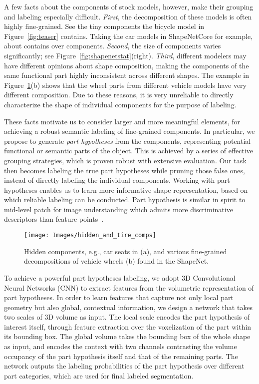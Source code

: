\documentclass[acmtog]{acmart}
\newcommand{\new}[1]{{\color{black}#1}}
\newcommand{\wang}[1]{{\color{black}#1}}
\begin{document}
{A few facts about the components of stock models, however, make their grouping and labeling especially difficult.
\emph{First}, the decomposition of these models is often highly fine-grained.
See the tiny components the bicycle model in Figure~\ref{fig:teaser} contains.
Taking the car models in ShapeNetCore for example, about  contains over  components.
\emph{Second}, the size of components varies significantly; see Figure~\ref{fig:shapenetstat}(right).
\emph{Third}, different modelers may have different opinions about shape composition,
making the components of the same functional part highly inconsistent across different shapes.
The example in Figure~\ref{fig:car}(b) shows that the wheel parts from different vehicle models
have very different composition.
Due to these reasons, it is very unreliable to directly characterize the shape of individual components for the purpose of labeling.





These facts motivate us to consider larger and more meaningful elements, for achieving a robust semantic
labeling of fine-grained components.
In particular, we propose to generate \emph{part hypotheses} from the components, representing potential
functional or semantic parts of the object. This is achieved by a series of effective grouping
strategies, which is proven robust with extensive evaluation.
\wang{Our task then becomes labeling the true part hypotheses while pruning those false ones,
instead of directly labeling the individual components.}
Working with part hypotheses enables us to learn more informative shape representation,
based on which reliable labeling can be conducted.
Part hypothesis is similar in spirit to mid-level patch for image understanding which admits
more discriminative descriptors than feature points~\cite{Singh2012}.



\begin{figure}[t]
  \centering
  \texttt{[image: Images/hidden\_and\_tire\_comps]}
  \caption{\new{Hidden components, e.g., car seats in (a), and various fine-grained decompositions of vehicle wheels (b)
  found in the ShapeNet.}}
  \label{fig:car}
\end{figure}


To achieve a powerful part hypotheses labeling, we adopt 3D Convolutional Neural Networks (CNN)
to extract features from the volumetric representation of part hypotheses.
In order to learn features that capture not only local part geometry but also global, contextual information,
we design a network that takes two scales of 3D volume as input.
The local scale encodes the part hypothesis of interest itself, through feature extraction over
the voxelization of the part within its bounding box.
The global volume takes the bounding box of the whole shape as input, and encodes the context
with two channels contrasting the volume occupancy of the part hypothesis itself and that of the remaining parts.
The network outputs the labeling probabilities of the part hypothesis over different part categories, which are used for final labeled segmentation.

}
\end{document}
